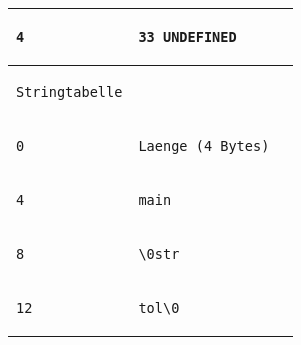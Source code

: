 \documentclass{ti2}
\begin{document}
\begin{tabular}{ | l | l | l|}
\begin{lstlisting}
4
\end{lstlisting} &
\begin{lstlisting}
33 UNDEFINED
\end{lstlisting} &
\begin{lstlisting}
\end{lstlisting} \\ \hline \hline

\begin{lstlisting}
Stringtabelle
\end{lstlisting} &
\begin{lstlisting}

\end{lstlisting} &
\begin{lstlisting}
\end{lstlisting} \\ \hline

\begin{lstlisting}
0
\end{lstlisting} &
\begin{lstlisting}
Laenge (4 Bytes)
\end{lstlisting} &
\begin{lstlisting}
\end{lstlisting} \\ \hline


\begin{lstlisting}
4
\end{lstlisting} &
\begin{lstlisting}
main
\end{lstlisting} &
\begin{lstlisting}
\end{lstlisting} \\ \hline

\begin{lstlisting}
8
\end{lstlisting} &
\begin{lstlisting}
\0str
\end{lstlisting} &
\begin{lstlisting}
\end{lstlisting} \\ \hline

\begin{lstlisting}
12
\end{lstlisting} &
\begin{lstlisting}
tol\0
\end{lstlisting} &
\begin{lstlisting}
\end{lstlisting} \\ \hline


\end{tabular}
\end{document}
